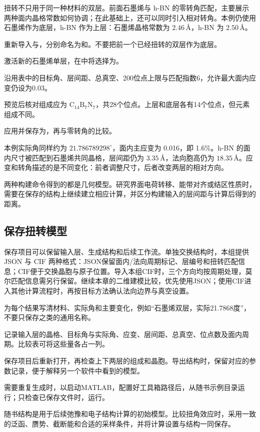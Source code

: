 扭转不只用于同一种材料的双层。前面石墨烯与 h-BN 的零转角匹配，主要展示两种面内晶格常数如何协调；在此基础上，还可以同时引入相对转角。本例仍使用石墨烯作为底层，h-BN 作为上层：石墨烯晶格常数为 $2.46\,\text{\AA}$，h-BN 为 $2.50\,\text{\AA}$。

\begin{steps}
  \item 重新导入与，分别命名为和。不要把前一个已经扭转的双层作为底层。
  \item 激活新的石墨烯单层，在中将选择为。
  \item 沿用表中的目标角、层间距、总真空、200位点上限与匹配指数6，允许最大面内应变仍设为0.03。
  \item 预览后核对组成应为 $\mathrm{C_{14}B_7N_7}$，共28个位点。上层和底层各有14个位点，但元素组成不同。
  \item 应用并保存为，再与零转角的比较。
\end{steps}

本例实际角同样约为 $21.786789298^\circ$，面内主应变为 0.016，即 1.6\%。h-BN 的面内尺寸被匹配到石墨烯共同晶格，层间距仍为 $3.35\,\text{\AA}$，法向胞高仍为 $18.35\,\text{\AA}$。应变和转角描述的是不同变化：前者调整尺寸，后者改变两层的相对方向。

两种构建命令得到的都是几何模型。研究界面电荷转移、能带对齐或结区性质时，需要在保存的结构上继续建立相应计算，并区分构建输入的层间距与计算后得到的距离。

\subsection{保存扭转模型}

保存项目可以保留输入层、生成结构和后续工作流。单独交换结构时，本组提供 JSON 与 CIF 两种格式：JSON保留面内/法向周期标记、层编号和扭转匹配信息；CIF便于交换晶胞与原子位置。导入本组CIF时，三个方向均按周期处理，莫尔匹配信息需另行保留。继续本章的二维建模比较，优先使用JSON；使用CIF进入其他计算流程时，再按目标方法确认法向边界与真空设置。

\begin{steps}
  \item 为每个结果写清材料、实际角和主要变化，例如“石墨烯双层，实际21.7868度”，不要只保存之类的通用名称。
  \item 记录输入层的晶格、目标角与实际角、应变、层间距、总真空、位点数及面内周期。比较表可将这些量各占一列。
  \item 保存项目后重新打开，再检查上下两层的组成和晶胞。导出结构时，保留对应的参数记录，便于解释另一个软件中看到的模型。
  \item 需要重复生成时，以启动MATLAB\regmark{}，配置好工具箱路径后，从随书示例目录运行；只检查已保存文件时，运行。
\end{steps}

随书结构是用于后续弛豫和电子结构计算的初始模型。比较扭角效应时，采用一致的泛函、赝势、截断能和合适的采样条件，并将计算设置与结构一同保存。
